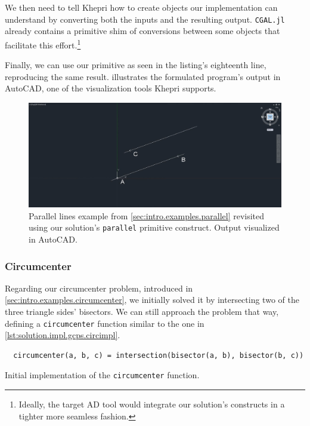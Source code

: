 We then need to tell Khepri how to create objects our implementation can
understand by converting both the inputs and the resulting output.
\texttt{CGAL.jl} already contains a primitive shim of conversions between some
objects that facilitate this effort.\footnote{Ideally, the target \ac{AD} tool
would integrate our solution's constructs in a tighter more seamless fashion.}

Finally, we can use our primitive as seen in the listing's eighteenth line,
reproducing the same result.  illustrates
the formulated program's output in AutoCAD, one of the visualization tools
Khepri supports.

\begin{figure}[htbp]
  \includegraphics[width=\linewidth]{fig/autocad-parallel} 
  \caption[Parallel lines example using our solution]{
    Parallel lines example from \cref{sec:intro.examples.parallel} revisited
    using our solution's \texttt{parallel} primitive construct.  Output
    visualized in AutoCAD.}%
  \label{fig:solution.impl.gcps.parallel}
\end{figure}

\subsubsection{Circumcenter}%
\label{sec:solution.impl.gcps.circumcenter}

Regarding our circumcenter problem, introduced in
\cref{sec:intro.examples.circumcenter}, we initially solved it by intersecting
two of the three triangle sides' bisectors.  We can still approach the problem
that way, defining a \texttt{circumcenter} function similar to the one in
\cref{lst:solution.impl.gcps.circimpl}.

\begin{listing}[htbp]
  \begin{verbatim}
  circumcenter(a, b, c) = intersection(bisector(a, b), bisector(b, c)) 
  \end{verbatim}
  \caption[Initial circumcenter solution]{
    Initial implementation of the \texttt{circumcenter} function.}%
  \label{lst:solution.impl.gcps.circimpl}
\end{listing}


